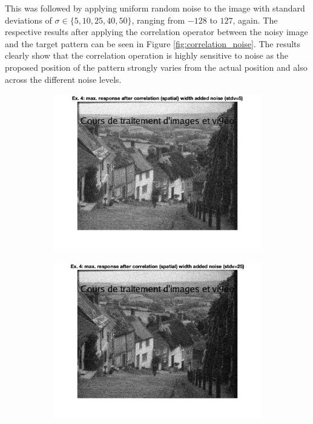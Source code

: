 \documentclass{article}
\begin{document}
This was followed by applying uniform random noise to the image with standard deviations of $\sigma \in \{5, 10, 25, 40, 50\}$, ranging from $-128$ to $127$, again. The respective results after applying the correlation operator between the noisy image and the target pattern can be seen in Figure \ref{fig:correlation_noise}. The results clearly show that the correlation operation is highly sensitive to noise as the proposed position of the pattern strongly varies from the actual position and also across the different noise levels.

\begin{figure}
    \centering
    \begin{subfigure}[c]{0.3\textwidth}
        \includegraphics[width=\textwidth]{images/corr_spatial_noise_5.png}
    \end{subfigure}
    \begin{subfigure}[c]{0.3\textwidth}
        \includegraphics[width=\textwidth]{images/corr_spatial_noise_25.png}

\end{subfigure}
\end{figure}
\end{document}
